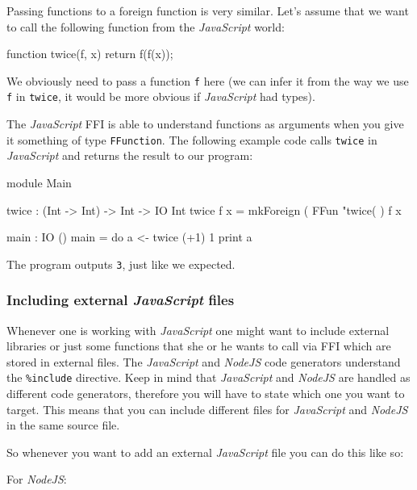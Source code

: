 \noindent
Passing functions to a foreign function is very similar.
Let's assume that we want to call the following function from the \emph{JavaScript} world:

\begin{code}[language=c]
function twice(f, x) {
  return f(f(x));
}
\end{code}

\noindent
We obviously need to pass a function \texttt{f} here (we can infer it from the way we use \texttt{f} in \texttt{twice}, it would be more obvious if \emph{JavaScript} had types).

\noindent
The \emph{JavaScript} FFI is able to understand functions as arguments when you give it something of type \texttt{FFunction}.
The following example code calls \texttt{twice} in \emph{JavaScript} and returns the result to our \Idris{} program:

\begin{code}
module Main

twice : (Int -> Int) -> Int -> IO Int
twice f x = mkForeign (
  FFun "twice(%
) f x

main : IO ()
main = do
  a <- twice (+1) 1
  print a
\end{code}

\noindent
The program outputs \texttt{3}, just like we expected.

\subsubsection*{Including external \emph{JavaScript} files}

\noindent
Whenever one is working with \emph{JavaScript} one might want to include
external libraries or just some functions that she or he wants to call via
FFI which are stored in external files. The \emph{JavaScript} and \emph{NodeJS} code generators
understand the \texttt{\%include} directive. Keep in mind that \emph{JavaScript} and \emph{NodeJS}
are handled as different code generators, therefore you will have to state which one you want to target.
This means that you can include different files for \emph{JavaScript} and \emph{NodeJS} in the same
\Idris{} source file.

\noindent
So whenever you want to add an external \emph{JavaScript} file
you can do this like so:

\noindent
For \emph{NodeJS}:

\begin{code}
\end{code}

